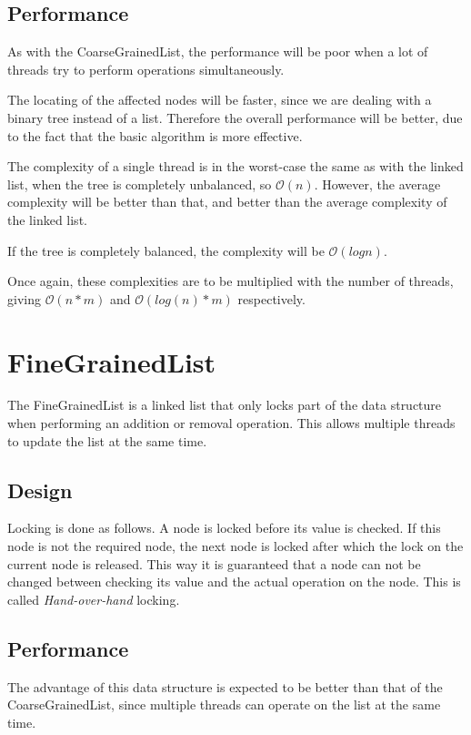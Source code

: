 \documentclass[a4paper]{article}
\def\bigoh{\mathcal{O}}
\begin{document}
\subsection{Performance}

As with the CoarseGrainedList, the performance will be poor when a lot of
threads try to perform operations simultaneously.

The locating of the affected nodes will be faster, since we are dealing
with a binary tree instead of a list. Therefore the overall performance
will be better, due to the fact that the basic algorithm is more effective.

The complexity of a single thread is in the worst-case the same as with the
linked list, when the tree is completely unbalanced, so $\bigoh(n)$.
However, the average complexity will be better than that, and better than the
average complexity of the linked list.

If the tree is completely balanced, the complexity will be
$\bigoh(log n)$.

Once again, these complexities are to be multiplied with the number of
threads, giving $\bigoh(n * m)$ and $\bigoh(log(n) * m)$
respectively.

\section{FineGrainedList}

The FineGrainedList is a linked list that only locks part of the data
structure when performing an addition or removal operation. This allows
multiple threads to update the list at the same time.

\subsection{Design}

Locking is done as follows. A node is locked before its value is checked.
If this node is not the required node, the next node is locked after which the
lock on the current node is released. This way it is guaranteed that a node
can not be changed between checking its value and the actual operation on the
node. This is called \emph{Hand-over-hand} locking.

\subsection{Performance}

The advantage of this data structure is expected to be better than that of the
CoarseGrainedList, since multiple threads can operate on the list at the same
time.
\end{document}
